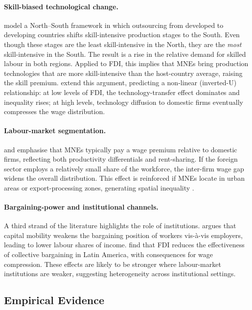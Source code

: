\documentclass[12pt,a4paper]{article}
\begin{document}
\paragraph{Skill-biased technological change.}
\citet{Feenstra1996} model a North--South framework in which outsourcing from developed to developing countries shifts skill-intensive production stages to the South.  Even though these stages are the least skill-intensive in the North, they are the \textit{most} skill-intensive in the South.  The result is a rise in the relative demand for skilled labour in both regions.  Applied to FDI, this implies that MNEs bring production technologies that are more skill-intensive than the host-country average, raising the skill premium.  \citet{Figini2011} extend this argument, predicting a non-linear (inverted-U) relationship: at low levels of FDI, the technology-transfer effect dominates and inequality rises; at high levels, technology diffusion to domestic firms eventually compresses the wage distribution.

\paragraph{Labour-market segmentation.}
\citet{Markusen2001} and \citet{Aitken1996} emphasise that MNEs typically pay a wage premium relative to domestic firms, reflecting both productivity differentials and rent-sharing.  If the foreign sector employs a relatively small share of the workforce, the inter-firm wage gap widens the overall distribution.  This effect is reinforced if MNEs locate in urban areas or export-processing zones, generating spatial inequality \citep{Jensen2010}.

\paragraph{Bargaining-power and institutional channels.}
A third strand of the literature highlights the role of institutions.  \citet{Rodrik1997} argues that capital mobility weakens the bargaining position of workers vis-\`a-vis employers, leading to lower labour shares of income.  \citet{Bogliaccini2009} find that FDI reduces the effectiveness of collective bargaining in Latin America, with consequences for wage compression.  These effects are likely to be stronger where labour-market institutions are weaker, suggesting heterogeneity across institutional settings.

\subsection{Empirical Evidence}
\end{document}
